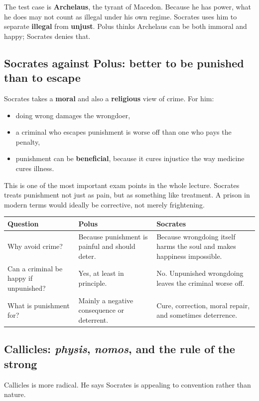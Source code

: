\documentclass[11pt]{article}
\newcommand{\keyterm}[1]{\textbf{#1}}
\begin{document}
The test case is \keyterm{Archelaus}, the tyrant of Macedon. Because he has power, what he does may not count as illegal under his own regime. Socrates uses him to separate \textbf{illegal} from \textbf{unjust}. Polus thinks Archelaus can be both immoral and happy; Socrates denies that.

\subsection*{Socrates against Polus: better to be punished than to escape}
Socrates takes a \textbf{moral} and also a \textbf{religious} view of crime. For him:
\begin{itemize}
\item doing wrong damages the wrongdoer,
\item a criminal who escapes punishment is worse off than one who pays the penalty,
\item punishment can be \textbf{beneficial}, because it cures injustice the way medicine cures illness.
\end{itemize}

This is one of the most important exam points in the whole lecture. Socrates treats punishment not just as pain, but as something like treatment. A prison in modern terms would ideally be corrective, not merely frightening.


\begin{tabularx}{\linewidth}{@{}lXX@{}}
\toprule
\textbf{Question} & \textbf{Polus} & \textbf{Socrates} \\
\midrule
Why avoid crime? & Because punishment is painful and should deter. & Because wrongdoing itself harms the soul and makes happiness impossible. \\
Can a criminal be happy if unpunished? & Yes, at least in principle. & No. Unpunished wrongdoing leaves the criminal worse off. \\
What is punishment for? & Mainly a negative consequence or deterrent. & Cure, correction, moral repair, and sometimes deterrence. \\
\bottomrule
\end{tabularx}

\subsection*{Callicles: \textit{physis}, \textit{nomos}, and the rule of the strong}
Callicles is more radical. He says Socrates is appealing to convention rather than nature.
\end{document}
